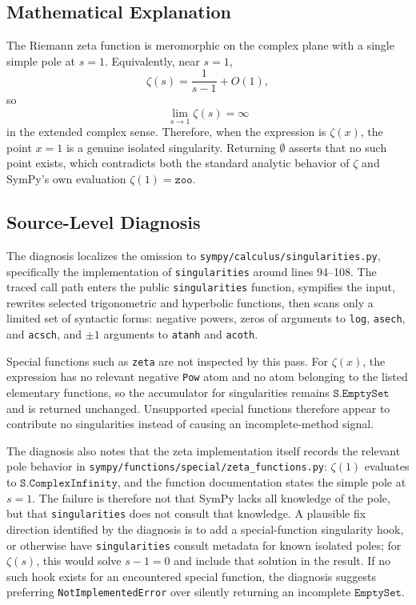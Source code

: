 \documentclass[11pt]{article}
\begin{document}
\subsection{Mathematical Explanation}

The Riemann zeta function is meromorphic on the complex plane with a single simple pole at \(s=1\). Equivalently, near \(s=1\),
\[
\zeta(s) = \frac{1}{s-1} + O(1),
\]
so
\[
\lim_{s \to 1} \zeta(s) = \infty
\]
in the extended complex sense. Therefore, when the expression is \(\zeta(x)\), the point \(x=1\) is a genuine isolated singularity. Returning \(\emptyset\) asserts that no such point exists, which contradicts both the standard analytic behavior of \(\zeta\) and SymPy's own evaluation \(\zeta(1)=\mathtt{zoo}\).

\subsection{Source-Level Diagnosis}

The diagnosis localizes the omission to \nolinkurl{sympy/calculus/singularities.py}, specifically the implementation of \texttt{singularities} around lines 94--108. The traced call path enters the public \texttt{singularities} function, sympifies the input, rewrites selected trigonometric and hyperbolic functions, then scans only a limited set of syntactic forms: negative powers, zeros of arguments to \texttt{log}, \texttt{asech}, and \texttt{acsch}, and \(\pm 1\) arguments to \texttt{atanh} and \texttt{acoth}.

Special functions such as \texttt{zeta} are not inspected by this pass. For \(\zeta(x)\), the expression has no relevant negative \texttt{Pow} atom and no atom belonging to the listed elementary functions, so the accumulator for singularities remains \(\mathtt{S.EmptySet}\) and is returned unchanged. Unsupported special functions therefore appear to contribute no singularities instead of causing an incomplete-method signal.

The diagnosis also notes that the zeta implementation itself records the relevant pole behavior in \nolinkurl{sympy/functions/special/zeta_functions.py}: \(\zeta(1)\) evaluates to \(\mathtt{S.ComplexInfinity}\), and the function documentation states the simple pole at \(s=1\). The failure is therefore not that SymPy lacks all knowledge of the pole, but that \texttt{singularities} does not consult that knowledge. A plausible fix direction identified by the diagnosis is to add a special-function singularity hook, or otherwise have \texttt{singularities} consult metadata for known isolated poles; for \(\zeta(s)\), this would solve \(s-1=0\) and include that solution in the result. If no such hook exists for an encountered special function, the diagnosis suggests preferring \texttt{NotImplementedError} over silently returning an incomplete \(\mathtt{EmptySet}\).
\end{document}
